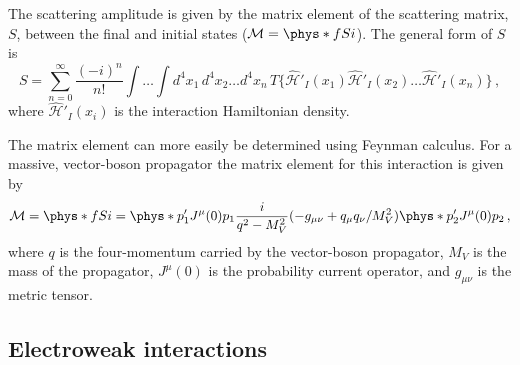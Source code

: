   The scattering amplitude is given by the matrix element of the scattering
  matrix, $S$, between the final and initial states ($\mathcal{M} =
  \phys*{f}{S}{i}$).  The general form of $S$ is~\cite{Aitchison:2004cs}
  \begin{equation}
    S = \sum_{n=0}^{\infty} \frac{(-i)^n}{n!}\int\dots\int d^4x_1 \, d^4x_2 \dots d^4x_n\,
      T\{\hat{\mathcal{H}}'_I(x_1)\hat{\mathcal{H}}'_I(x_2)\dots\hat{\mathcal{H}}'_I(x_n)\} \,,
  \end{equation}
  where $\hat{\mathcal{H}}'_I(x_i)$ is the interaction Hamiltonian density.
  
  The matrix element can more easily be determined using Feynman calculus.  For
  a massive, vector-boson propagator the matrix element for this interaction is
  given by~\cite{Aitchison:2004cs}
  \begin{equation}\label{eq:genmatel}
    \mathcal{M} = \phys*{f}{S}{i} = \phys*{p_1'}{J^{\mu}(0)}{p_1} \frac{i}{q^2 - M_V^2}(-g_{\mu\nu} 
            + q_{\mu}q_{\nu}/M_V^2) \phys*{p_2'}{J^{\mu}(0)}{p_2} \,,
  \end{equation}
  where $q$ is the four-momentum carried by the vector-boson propagator, $M_V$
  is the mass of the propagator, $J^{\mu}(0)$ is the probability current
  operator, and $g_{\mu\nu}$ is the metric tensor.


\subsection{Electroweak interactions}

